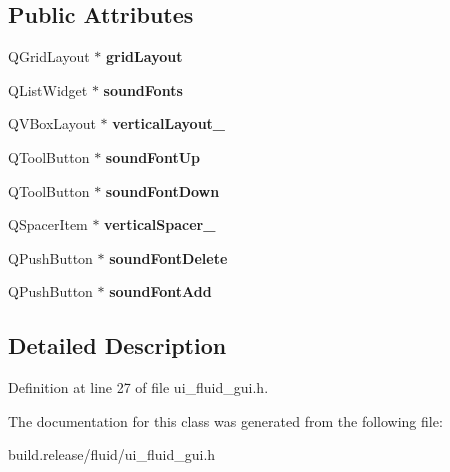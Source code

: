\subsection*{Public Attributes}
\begin{DoxyCompactItemize}
\item 
\mbox{\label{class_ui___fluid_gui_ae81092cebf87abda81f8a9d781dc9ad8}} 
Q\+Grid\+Layout $\ast$ {\bfseries grid\+Layout}
\item 
\mbox{\label{class_ui___fluid_gui_a5afdbc0905df081780b5632d6cea310d}} 
Q\+List\+Widget $\ast$ {\bfseries sound\+Fonts}
\item 
\mbox{\label{class_ui___fluid_gui_a40652522367c296973f9e2e165702864}} 
Q\+V\+Box\+Layout $\ast$ {\bfseries vertical\+Layout\+\_}
\item 
\mbox{\label{class_ui___fluid_gui_ad5a199d0600111bc16c0e5becfbc7cb3}} 
Q\+Tool\+Button $\ast$ {\bfseries sound\+Font\+Up}
\item 
\mbox{\label{class_ui___fluid_gui_a87d30921abb2f2e4bca5fc343f778528}} 
Q\+Tool\+Button $\ast$ {\bfseries sound\+Font\+Down}
\item 
\mbox{\label{class_ui___fluid_gui_ab6798068d0bef5114ba7866741cbc0a5}} 
Q\+Spacer\+Item $\ast$ {\bfseries vertical\+Spacer\+\_}
\item 
\mbox{\label{class_ui___fluid_gui_a11e7852a0d07114e42087f2528852f2e}} 
Q\+Push\+Button $\ast$ {\bfseries sound\+Font\+Delete}
\item 
\mbox{\label{class_ui___fluid_gui_a331cecec3d7bf3ce098f599d4675f9f1}} 
Q\+Push\+Button $\ast$ {\bfseries sound\+Font\+Add}
\end{DoxyCompactItemize}


\subsection{Detailed Description}


Definition at line 27 of file ui\+\_\+fluid\+\_\+gui.\+h.



The documentation for this class was generated from the following file\+:\begin{DoxyCompactItemize}
\item 
build.\+release/fluid/ui\+\_\+fluid\+\_\+gui.\+h\end{DoxyCompactItemize}
